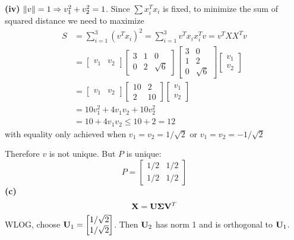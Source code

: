 \documentclass[a4paper, 12pt]{article}
\begin{document}
\begin{solution}
    \textbf{(iv)} $\lVert v\rVert = 1 \Rightarrow v_1^2 + v_2^2 = 1$. Since $\sum x_i^T x_i$ is fixed, to minimize the sum of squared distance we need to maximize
    \begin{align*}
        S & = \sum_{i=1}^{3} (v^T x_i)^2 = \sum_{i=1}^{3} v^Tx_ix_i^Tv = v^T X X^T v \\
          & = \begin{bmatrix}
                  v_1 & v_2
              \end{bmatrix}
        \begin{bmatrix}
            3 & 1 & 0        \\
            0 & 2 & \sqrt{6}
        \end{bmatrix}
        \begin{bmatrix}
            3 & 0        \\
            1 & 2        \\
            0 & \sqrt{6}
        \end{bmatrix}
        \begin{bmatrix}
            v_1 \\v_2
        \end{bmatrix}                                                               \\
          & = \begin{bmatrix}
                  v_1 & v_2
              \end{bmatrix}
        \begin{bmatrix}
            10 & 2  \\
            2  & 10
        \end{bmatrix}
        \begin{bmatrix}
            v_1 \\
            v_2
        \end{bmatrix}                                                               \\
          & = 10v_1^2 + 4v_1v_2 + 10v_2^2                                            \\
          & = 10 + 4v_1v_2 \leq 10 + 2 = 12
    \end{align*}
    with equality only achieved when $v_1 = v_2 = 1/\sqrt{2}$ or $v_1 = v_2 = -1/\sqrt{2}$

    Therefore $v$ is not unique. But $P$ is unique:
    \[
        P =
        \begin{bmatrix}
            1/2 & 1/2 \\
            1/2 & 1/2
        \end{bmatrix}
    \]
    \textbf{(c)}
    \[
        \mathbf{X} = \mathbf{U} \mathbf{\Sigma} \mathbf{V}^T
    \]
    WLOG, choose $\mathbf{U}_1 = \begin{bmatrix}
            1/\sqrt{2} \\
            1/\sqrt{2}
        \end{bmatrix}$. Then $\mathbf{U}_2$ has norm 1 and is orthogonal to $\mathbf{U}_1$.


\end{solution}
\end{document}
